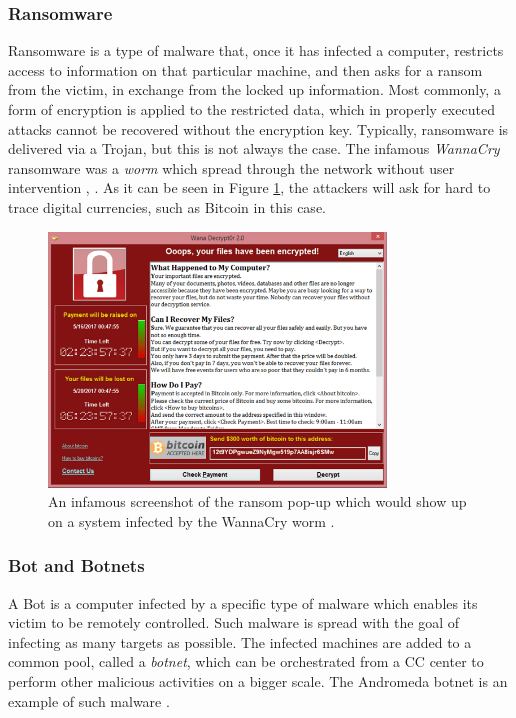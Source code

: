 \subsubsection{Ransomware}

Ransomware is a type of malware that, once it has infected a computer, restricts access to information on that particular machine, and then asks for a ransom from the victim, in exchange from the locked up information. Most commonly, a form of encryption is applied to the restricted data, which in properly executed attacks cannot be recovered without the encryption key. Typically, ransomware is delivered via a Trojan, but this is not always the case. The infamous \emph{WannaCry} ransomware was a \emph{worm} which spread through the network without user intervention \cite{wiki_wannacry}, \cite{wiki_ransomware}. As it can be seen in Figure \ref{fig:wannacry}, the attackers will ask for hard to trace digital currencies, such as Bitcoin in this case.

\begin{figure}[h]
    \centering
    \includegraphics[width=0.8\textwidth]{./images/wanacry.png}
    \caption{An infamous screenshot of the ransom pop-up which would show up on a system infected by the WannaCry worm \cite{wiki_wannacry}.}
    \label{fig:wannacry}
\end{figure}

\subsubsection{Bot and Botnets}

A Bot is a computer infected by a specific type of malware which enables its victim to be remotely controlled. Such malware is spread with the goal of infecting as many targets as possible. The infected machines are added to a common pool, called a \emph{botnet}, which can be orchestrated from a \gls{CC} center to perform other malicious activities on a bigger scale. The Andromeda botnet is an example of such malware \cite{andromeda} \cite{kaspersky_malware_types}.

